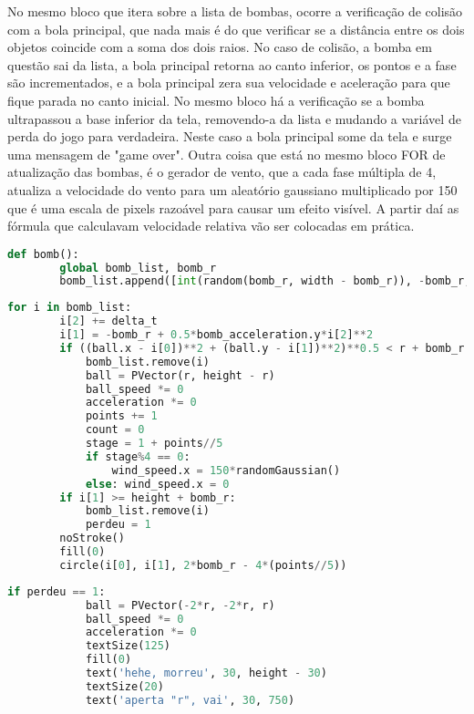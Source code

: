 \documentclass[12pt,letterpaper]{article}
\begin{document}
No mesmo bloco que itera sobre a lista de bombas, ocorre a verificação de colisão com a bola principal, que nada mais é do que verificar se a distância entre os dois objetos coincide com a soma dos dois raios. No caso de colisão, a bomba em questão sai da lista, a bola principal retorna ao canto inferior, os pontos e a fase são incrementados, e a bola principal zera sua velocidade e aceleração para que fique parada no canto inicial. No mesmo bloco há a verificação se a bomba ultrapassou a base inferior da tela, removendo-a da lista e mudando a variável de perda do jogo para verdadeira. Neste caso a bola principal some da tela e surge uma mensagem de "game over". Outra coisa que está no mesmo bloco FOR de atualização das bombas, é o gerador de vento, que a cada fase múltipla de 4, atualiza a velocidade do vento para um aleatório gaussiano multiplicado por 150 que é uma escala de pixels razoável para causar um efeito visível. A partir daí as fórmula que calculavam velocidade relativa vão ser colocadas em prática.

\begin{lstlisting}[language=Python,caption={Função geradora de bombas}]
    def bomb():
        global bomb_list, bomb_r
        bomb_list.append([int(random(bomb_r, width - bomb_r)), -bomb_r, 0])
\end{lstlisting}
    
\begin{lstlisting}[language=Python,caption={Iteração de queda livre das bombas}]
    for i in bomb_list:
        i[2] += delta_t
        i[1] = -bomb_r + 0.5*bomb_acceleration.y*i[2]**2
        if ((ball.x - i[0])**2 + (ball.y - i[1])**2)**0.5 < r + bomb_r - 2*(points//5):
            bomb_list.remove(i)
            ball = PVector(r, height - r)
            ball_speed *= 0
            acceleration *= 0
            points += 1
            count = 0
            stage = 1 + points//5
            if stage%4 == 0:
                wind_speed.x = 150*randomGaussian()
            else: wind_speed.x = 0
        if i[1] >= height + bomb_r:
            bomb_list.remove(i)
            perdeu = 1
        noStroke()
        fill(0)
        circle(i[0], i[1], 2*bomb_r - 4*(points//5))
\end{lstlisting}        
\begin{lstlisting}[language=Python,caption={Texto de "Game Over"}]
        if perdeu == 1:
            ball = PVector(-2*r, -2*r, r)
            ball_speed *= 0
            acceleration *= 0
            textSize(125)
            fill(0)
            text('hehe, morreu', 30, height - 30)
            textSize(20)
            text('aperta "r", vai', 30, 750)
\end{lstlisting}
\end{document}
